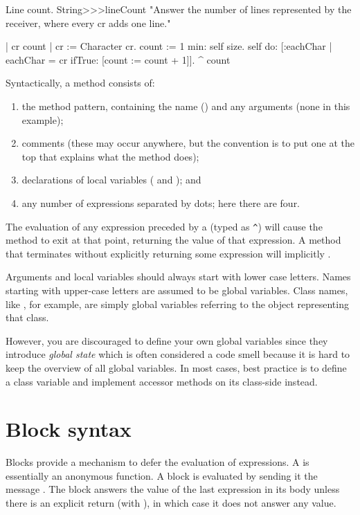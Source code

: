 \documentclass[a4paper,10pt,twoside]{book}
\begin{document}
\begin{method}[lineCount]{Line count.}
String>>>lineCount
   "Answer the number of lines represented by the receiver,
   where every cr adds one line."
   
   | cr count |
   cr := Character cr.
   count := 1 min: self size.
   self do: [:eachChar | 
      eachChar = cr ifTrue: [count := count + 1]].
   ^ count
\end{method}

Syntactically, a method consists of:
\begin{enumerate}
  \item the method pattern, containing the name (\ie {}) and any arguments (none in this example);
  \item comments (these may occur anywhere, but the convention is to put one at the top that explains what the method does);
  \item declarations of local variables (\ie {} and ); and
  \item any number of expressions separated by dots; here there are four.
\end{enumerate}

The evaluation of any expression preceded by a \ct{^} (typed as \verb|^|) will cause the method to exit at that point, returning the value of that expression.
A method that terminates without explicitly returning some expression will implicitly  .

Arguments and local variables should always start with lower case letters.
Names starting with upper-case letters are assumed to be global variables.
Class names, like , for example, are simply global variables referring to the object representing that class.

However, you are discouraged to define your own global variables since they introduce \emph{global state} which is often considered a code smell because it is hard to keep the overview of all global variables.
In most cases, best practice is to define a class variable and implement accessor methods on its class-side instead.

\section{Block syntax}

Blocks provide a mechanism to defer the evaluation of expressions.
A  is essentially an anonymous function.
A block is evaluated by sending it the message .
The block answers the value of the last expression in its body unless there is an explicit return (with \ct{^}), in which case it does not answer any value.
\end{document}

